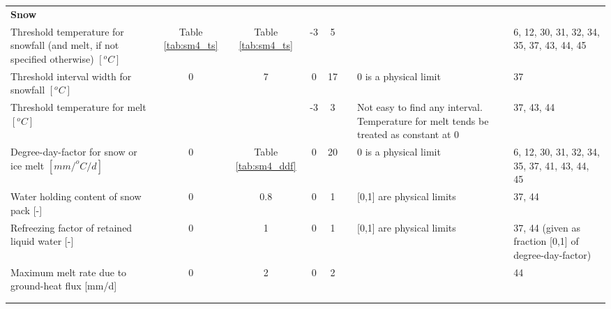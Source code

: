 \begin{longtable}{p{11.215em}ccccp{13em}p{13em}l}
\textbf{Snow} &       &       &       &       & \multicolumn{1}{l}{} & \multicolumn{1}{l}{} &  \\
    Threshold temperature for snowfall (and melt, if not specified otherwise) $[^oC]$ & \multicolumn{1}{p{3.57em}}{Table \ref{tab:sm4_ts}} & \multicolumn{1}{p{3.785em}}{Table \ref{tab:sm4_ts}} & -3    & 5     & \cite{Kienzle2008,Kollat2012} & \multicolumn{1}{l}{} & \multicolumn{1}{p{10em}}{6, 12, 30, 31, 32, 34, 35, 37, 43, 44, 45} \\
    Threshold interval width for snowfall $[^oC]$ & 0     & 7     & 0     & 17    & \cite{Kienzle2008} & 0 is a physical limit & 37 \\
    Threshold temperature for melt $[^oC]$ &       &       & -3    & 3     & \multicolumn{1}{l}{} & Not easy to find any interval. Temperature for melt tends be treated as constant at 0 & \multicolumn{1}{p{10em}}{37, 43, 44} \\
    Degree-day-factor for snow or ice melt $[mm/^oC/d]$ & 0     & \multicolumn{1}{p{3.785em}}{Table \ref{tab:sm4_ddf}} & 0     & 20    & \multicolumn{1}{l}{} & 0 is a physical limit & \multicolumn{1}{p{10em}}{6, 12, 30, 31, 32, 34, 35, 37, 41, 43, 44, 45} \\
    Water holding content of snow pack [-] & 0     & 0.8   & 0     & 1     & \cite{Kollat2012} & [0,1] are physical limits & \multicolumn{1}{p{10em}}{37, 44} \\
    Refreezing factor of retained liquid water [-] & 0     & 1     & 0     & 1     & \multicolumn{1}{l}{} & [0,1] are physical limits & \multicolumn{1}{p{10em}}{37, 44 (given as fraction [0,1] of degree-day-factor)} \\
    Maximum melt rate due to ground-heat flux [mm/d] & 0     & 2     & 0     & 2     & \cite{Schaefli2014} & \multicolumn{1}{l}{} & 44 \\
    \multicolumn{1}{l}{} &       &       &       &       & \multicolumn{1}{l}{} & \multicolumn{1}{l}{} &  \\

\newpage


\end{longtable}
